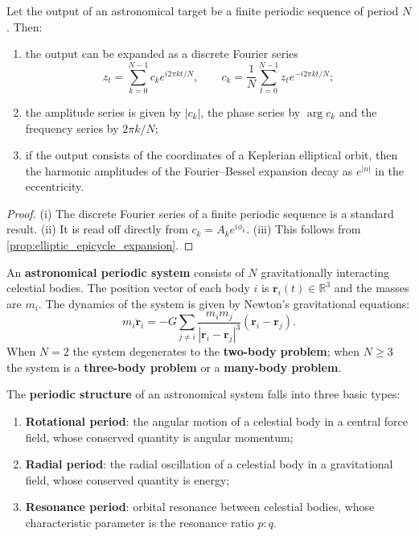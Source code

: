 \begin{theorem}\label{thm:astro_series_reconstruction}
Let the output of an astronomical target be a finite periodic sequence of period \(N\). Then:
\begin{enumerate}[label=(\roman*)]
    \item the output can be expanded as a discrete Fourier series
    \[
    z_t=\sum_{k=0}^{N-1}c_k e^{i2\pi kt/N},\qquad
    c_k=\frac1N\sum_{t=0}^{N-1}z_t e^{-i2\pi kt/N};
    \]
    \item the amplitude series is given by \(|c_k|\), the phase series by \(\arg c_k\) and the frequency series by \(2\pi k/N\);
    \item if the output consists of the coordinates of a Keplerian elliptical orbit, then the harmonic amplitudes of the Fourier--Bessel expansion decay as \(e^{|n|}\) in the eccentricity.
\end{enumerate}
\end{theorem}

\begin{proof}
(i) The discrete Fourier series of a finite periodic sequence is a standard result.
(ii) It is read off directly from \(c_k=A_k e^{i\phi_k}\).
(iii) This follows from \cref{prop:elliptic_epicycle_expansion}.
\end{proof}

\begin{definition}\label{def:astronomical_periodic_system}
An \textbf{astronomical periodic system} consists of \(N\) gravitationally interacting celestial bodies. The position vector of each body \(i\) is \(\mathbf r_i(t)\in\mathbb R^3\) and the masses are \(m_i\). The dynamics of the system is given by Newton's gravitational equations:
\[
m_i\ddot{\mathbf r}_i=-G\sum_{j\neq i}\frac{m_im_j}{|\mathbf r_i-\mathbf r_j|^3}(\mathbf r_i-\mathbf r_j).
\]
When \(N=2\) the system degenerates to the \textbf{two-body problem}; when \(N\ge3\) the system is a \textbf{three-body problem} or a \textbf{many-body problem}.
\end{definition}

\begin{definition}\label{def:astronomical_periodic_structure}
The \textbf{periodic structure} of an astronomical system falls into three basic types:
\begin{enumerate}[label=(\roman*)]
    \item \textbf{Rotational period}: the angular motion of a celestial body in a central force field, whose conserved quantity is angular momentum;
    \item \textbf{Radial period}: the radial oscillation of a celestial body in a gravitational field, whose conserved quantity is energy;
    \item \textbf{Resonance period}: orbital resonance between celestial bodies, whose characteristic parameter is the resonance ratio \(p:q\).
\end{enumerate}
\end{definition}

